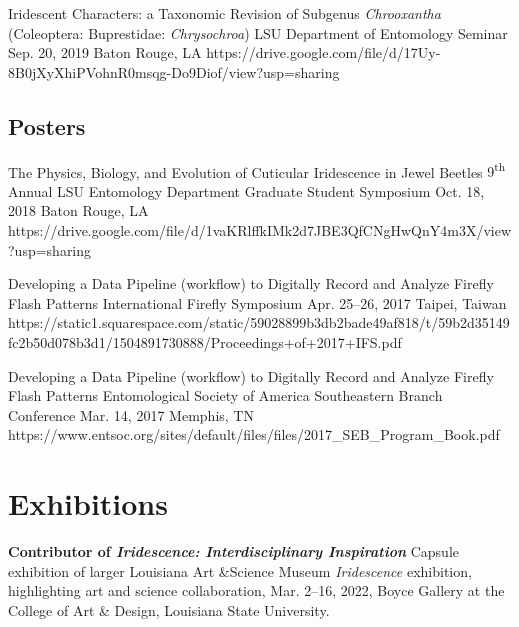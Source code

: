 \documentclass{article}
\newcommand{\ts}{\textsuperscript}
\newcommand{\hindent}{\hangindent=10pt}
\begin{document}
{Iridescent Characters: a Taxonomic Revision of Subgenus \textit{Chrooxantha} (Coleoptera: Buprestidae: \textit{Chrysochroa})}
{LSU Department of Entomology Seminar}
{Sep. 20, 2019}
{Baton Rouge, LA}
{https://drive.google.com/file/d/17Uy-8B0jXyXhiPVohnR0msqg-Do9Diof/view?usp=sharing}

\subsection{Posters}
{The Physics, Biology, and Evolution of Cuticular Iridescence in Jewel Beetles}
{9\ts{th} Annual LSU Entomology Department Graduate Student Symposium}
{Oct. 18, 2018}
{Baton Rouge, LA}
{https://drive.google.com/file/d/1vaKRlffkIMk2d7JBE3QfCNgHwQnY4m3X/view?usp=sharing}

{Developing a Data Pipeline (workflow) to Digitally Record and Analyze Firefly Flash Patterns}
{International Firefly Symposium}
{Apr. 25--26, 2017}
{Taipei, Taiwan}
{https://static1.squarespace.com/static/59028899b3db2bade49af818/t/59b2d35149fc2b50d078b3d1/1504891730888/Proceedings+of+2017+IFS.pdf}

{Developing a Data Pipeline (workflow) to Digitally Record and Analyze Firefly Flash Patterns}
{Entomological Society of America Southeastern Branch Conference}
{Mar. 14, 2017}
{Memphis, TN}
{https://www.entsoc.org/sites/default/files/files/2017_SEB_Program_Book.pdf}

\section{Exhibitions}

\newcommand{\exhibition}[4]{
    \noindent
    \hindent
    \small
    \textbf{#1} %
    {#2}, %
    {#3}, %
    {#4} %
    \normalsize \par
}

\exhibition{Contributor of \textit{Iridescence: Interdisciplinary Inspiration}}
{Capsule exhibition of larger Louisiana Art \&Science Museum \textit{Iridescence} exhibition, highlighting art and science collaboration}
{Mar. 2--16, 2022}
{Boyce Gallery at the College of Art \& Design, Louisiana State University.}
\end{document}
